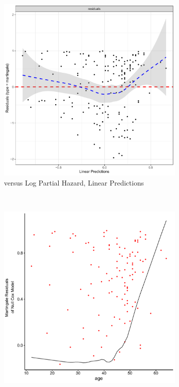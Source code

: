 \begin{figure}[H]
\centering
  \begin{subfigure}[c]{0.48\textwidth}\centering
  \includegraphics[width=\textwidth]{figures/survival/stanford_cox_age_martingale_residuals}
  \caption{versus Log Partial Hazard, \newline\ie Linear Predictions}
  \label{fig:cox:martingale_residuals:prediction}
  \end{subfigure}
  ~
  \begin{subfigure}[c]{0.48\textwidth}\centering
  \includegraphics[width=\textwidth]{figures/survival/stanford_cox_age_martingale_residuals_age}

\end{subfigure}
\end{figure}
